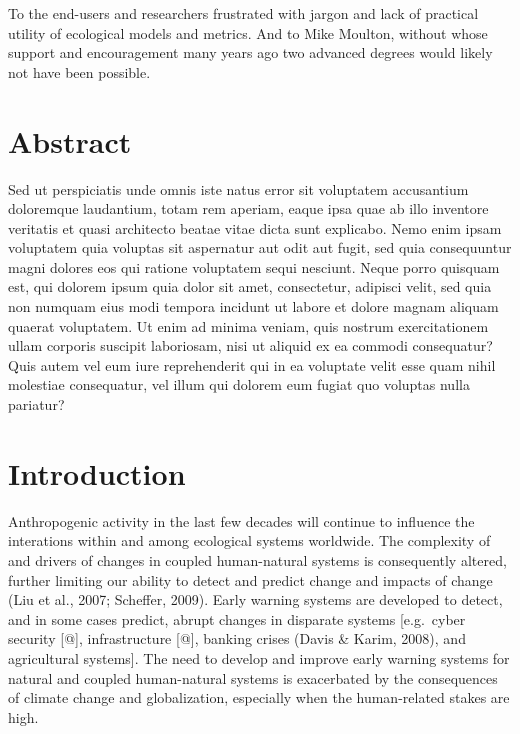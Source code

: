 \documentclass[12pt,twoside,openany]{reedthesis}
\begin{document}
  \begin{dedication}
    To the end-users and researchers frustrated with jargon and lack of
    practical utility of ecological models and metrics. And to Mike Moulton,
    without whose support and encouragement many years ago two advanced
    degrees would likely not have been possible.
  \end{dedication}
\mainmatter %
\pagestyle{fancyplain} %
\doublespacing{} %

\chapter*{Abstract}\label{abstract}

Sed ut perspiciatis unde omnis iste natus error sit voluptatem
accusantium doloremque laudantium, totam rem aperiam, eaque ipsa quae ab
illo inventore veritatis et quasi architecto beatae vitae dicta sunt
explicabo. Nemo enim ipsam voluptatem quia voluptas sit aspernatur aut
odit aut fugit, sed quia consequuntur magni dolores eos qui ratione
voluptatem sequi nesciunt. Neque porro quisquam est, qui dolorem ipsum
quia dolor sit amet, consectetur, adipisci velit, sed quia non numquam
eius modi tempora incidunt ut labore et dolore magnam aliquam quaerat
voluptatem. Ut enim ad minima veniam, quis nostrum exercitationem ullam
corporis suscipit laboriosam, nisi ut aliquid ex ea commodi consequatur?
Quis autem vel eum iure reprehenderit qui in ea voluptate velit esse
quam nihil molestiae consequatur, vel illum qui dolorem eum fugiat quo
voluptas nulla pariatur?

\chapter{Introduction}\label{intro}

Anthropogenic activity in the last few decades will continue to
influence the interations within and among ecological systems worldwide.
The complexity of and drivers of changes in coupled human-natural
systems is consequently altered, further limiting our ability to detect
and predict change and impacts of change (Liu et al., 2007; Scheffer,
2009). Early warning systems are developed to detect, and in some cases
predict, abrupt changes in disparate systems {[}e.g.~cyber security
{[}@{]}, infrastructure {[}@{]}, banking crises (Davis \& Karim, 2008),
and agricultural systems{]}. The need to develop and improve early
warning systems for natural and coupled human-natural systems is
exacerbated by the consequences of climate change and globalization,
especially when the human-related stakes are high.
\end{document}
